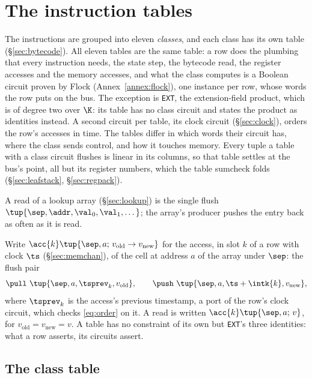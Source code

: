 \section{The instruction tables}\label{sec:tables}

The instructions are grouped into eleven \emph{classes}, and each class has its own table (\S\ref{sec:bytecode}). All eleven tables are the same table: a row does the plumbing that every instruction needs, the state step, the bytecode read, the register accesses and the memory accesses, and what the class computes is a Boolean circuit proven by Flock (Annex~\ref{annex:flock}), one instance per row, whose words the row puts on the bus. The exception is \texttt{EXT}, the extension-field product, which is of degree two over $\K$: its table has no class circuit and states the product as identities instead. A second circuit per table, its clock circuit (\S\ref{sec:clock}), orders the row's accesses in time. The tables differ in which words their circuit has, where the class sends control, and how it touches memory. Every tuple a table with a class circuit flushes is linear in its columns, so that table settles at the bus's point, all but its register numbers, which the table sumcheck folds (\S\ref{sec:leafstack}, \S\ref{sec:regpack}).

A read of a lookup array (\S\ref{sec:lookup}) is the single flush \pull\ $\tup{\sep,\addr,\val_0,\val_1,\dots}$; the array's producer pushes the entry back as often as it is read.

Write $\acc{k}\tup{\sep,a;\,v_{\mathrm{old}}\to v_{\mathrm{new}}}$ for the access, in slot $k$ of a row with clock $\ts$ (\S\ref{sec:memchan}), of the cell at address $a$ of the array under $\sep$: the flush pair
\[
  \pull\ \tup{\sep,a,\tsprev_k,v_{\mathrm{old}}},\qquad \push\ \tup{\sep,a,\ts+\intk{k},v_{\mathrm{new}}},
\]
where $\tsprev_k$ is the access's previous timestamp, a port of the row's clock circuit, which checks \eqref{eq:order} on it. A read is written $\acc{k}\tup{\sep,a;\,v}$, for $v_{\mathrm{old}}=v_{\mathrm{new}}=v$. A table has no constraint of its own but \texttt{EXT}'s three identities: what a row asserts, its circuits assert.

\subsection{The class table}\label{sec:tab-class}

